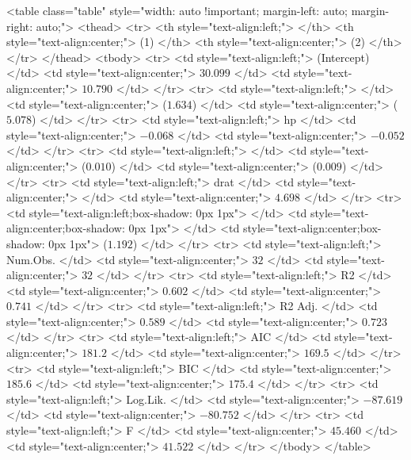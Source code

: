 <table class="table" style="width: auto !important; margin-left: auto; margin-right: auto;">
 <thead>
  <tr>
   <th style="text-align:left;">   </th>
   <th style="text-align:center;"> (1) </th>
   <th style="text-align:center;"> (2) </th>
  </tr>
 </thead>
<tbody>
  <tr>
   <td style="text-align:left;"> (Intercept) </td>
   <td style="text-align:center;"> $30.099$ </td>
   <td style="text-align:center;"> $10.790$ </td>
  </tr>
  <tr>
   <td style="text-align:left;">  </td>
   <td style="text-align:center;"> ($1.634$) </td>
   <td style="text-align:center;"> ($5.078$) </td>
  </tr>
  <tr>
   <td style="text-align:left;"> hp </td>
   <td style="text-align:center;"> $-0.068$ </td>
   <td style="text-align:center;"> $-0.052$ </td>
  </tr>
  <tr>
   <td style="text-align:left;">  </td>
   <td style="text-align:center;"> ($0.010$) </td>
   <td style="text-align:center;"> ($0.009$) </td>
  </tr>
  <tr>
   <td style="text-align:left;"> drat </td>
   <td style="text-align:center;">  </td>
   <td style="text-align:center;"> $4.698$ </td>
  </tr>
  <tr>
   <td style="text-align:left;box-shadow: 0px 1px">  </td>
   <td style="text-align:center;box-shadow: 0px 1px">  </td>
   <td style="text-align:center;box-shadow: 0px 1px"> ($1.192$) </td>
  </tr>
  <tr>
   <td style="text-align:left;"> Num.Obs. </td>
   <td style="text-align:center;"> $32$ </td>
   <td style="text-align:center;"> $32$ </td>
  </tr>
  <tr>
   <td style="text-align:left;"> R2 </td>
   <td style="text-align:center;"> $0.602$ </td>
   <td style="text-align:center;"> $0.741$ </td>
  </tr>
  <tr>
   <td style="text-align:left;"> R2 Adj. </td>
   <td style="text-align:center;"> $0.589$ </td>
   <td style="text-align:center;"> $0.723$ </td>
  </tr>
  <tr>
   <td style="text-align:left;"> AIC </td>
   <td style="text-align:center;"> $181.2$ </td>
   <td style="text-align:center;"> $169.5$ </td>
  </tr>
  <tr>
   <td style="text-align:left;"> BIC </td>
   <td style="text-align:center;"> $185.6$ </td>
   <td style="text-align:center;"> $175.4$ </td>
  </tr>
  <tr>
   <td style="text-align:left;"> Log.Lik. </td>
   <td style="text-align:center;"> $-87.619$ </td>
   <td style="text-align:center;"> $-80.752$ </td>
  </tr>
  <tr>
   <td style="text-align:left;"> F </td>
   <td style="text-align:center;"> $45.460$ </td>
   <td style="text-align:center;"> $41.522$ </td>
  </tr>
</tbody>
</table>
